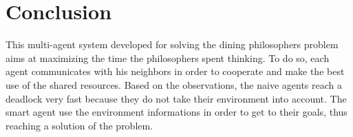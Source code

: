 \section{Conclusion}
This multi-agent system developed for solving the dining philosophers problem aims at maximizing the time the philosophers spent thinking. To do so, each agent communicates with his neighbors in order to cooperate and make the best use of the shared resources. Based on the observations, the naive agents reach a deadlock very fast because they do not take their environment into account. The smart agent use the environment informations in order to get to their goals, thus reaching a solution of the problem.
